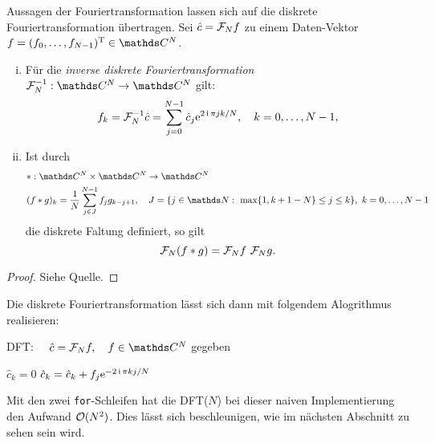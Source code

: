 \begin{satz}
Aussagen der Fouriertransformation lassen sich auf die diskrete Fouriertransformation übertragen.\newline
Sei $\hat{c} = \mathcal{F}_N f$ zu einem Daten-Vektor $f=\transp{(f_0,\ldots,f_{N-1})} \in\C^N$.
\begin{enumerate}[(i)]
\item Für die \emph{inverse diskrete Fouriertransformation}  $\calF_N^{-1}: \C^N\to\C^N$ gilt:
    \begin{displaymath}
        f_k = \mathcal{F}_N^{-1}\hat{c} = \sum_{j=0}^{N-1} \hat{c}_j {\operatorname{e}}^{2\operatorname{i}\pi jk/N}, \quad k=0, \ldots, N-1,
    \end{displaymath}

\item Ist durch
\begin{align*}
&*: \C^N\times\C^N\to\C^N \\
&(f*g)_k = \frac{1}{N} \sum_{j\in J}^{N-1} f_j g_{k-j+1}, \quad J=\{j\in\N:~\max\{1,k+1-N\}\leq j\leq k \},~k=0,\ldots,N-1
\end{align*} 
die diskrete Faltung definiert, so gilt
\begin{displaymath}
\mathcal{F}_N(f*g) = \mathcal{F}_N f ~ \mathcal{F}_N g.
\end{displaymath}
\end{enumerate}

\end{satz}
\begin{proof}
Siehe Quelle.
\end{proof}

Die diskrete Fouriertransformation lässt sich dann mit folgendem Alogrithmus realisieren:
\begin{algorithm}[H]
	\caption{DFT: $\quad \hat{c} = \calF_N f, \quad f\in\C^N$ gegeben}
	\label{DFT}
	
	\begin{algorithmic}
    		\State $\hat{c}_{k} = 0$
	            \State $\hat{c}_k = \hat{c}_k + f_j{\operatorname{e}}^{-2\operatorname{i}\pi kj/N}$
	         \EndFor	
		\EndFor
	\end{algorithmic}
\end{algorithm}

Mit den zwei \texttt{for}-Schleifen hat die DFT($N$) bei dieser naiven Implementierung den Aufwand $\mathcal{O}(N^2)$. Dies lässt sich beschleunigen, wie im nächsten Abschnitt zu sehen sein wird.
